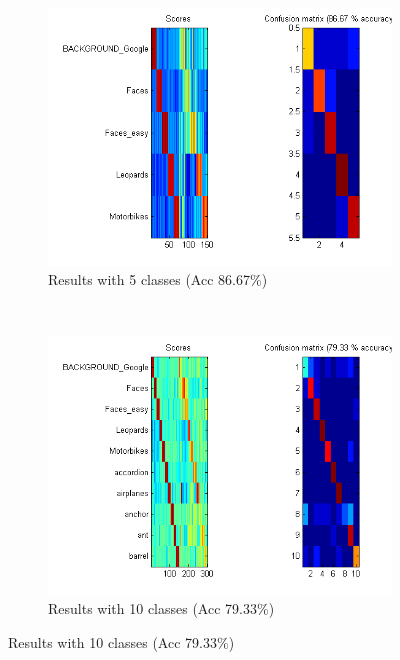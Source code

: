\begin{figure}[htb]
	\centering
	\begin{subfigure}[t]{0.4\textwidth}
		\includegraphics[width=\textwidth]{./img/ex1/eval-steps-10.png}
		\caption{Results with 5 classes (Acc 86.67\%)}
	\end{subfigure}
	~
	\begin{subfigure}[t]{0.4\textwidth}
		\includegraphics[width=\textwidth]{./img/ex1/eval-10-classes.png}
		\caption{Results with 10 classes (Acc 79.33\%)}
	\end{subfigure}
	

\end{figure}
